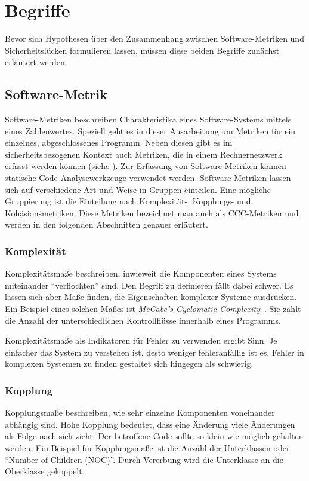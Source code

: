 \section{Begriffe}
\label{sec:begriffe}
Bevor sich Hypothesen über den Zusammenhang zwischen Software-Metriken und Sicherheitslücken formulieren lassen, müssen diese beiden Begriffe zunächst erläutert werden.

\subsection{Software-Metrik}
Software-Metriken beschreiben Charakteristika eines Software-Systems mittels eines Zahlenwertes.
Speziell geht es in dieser Ausarbeitung um Metriken für ein einzelnes, abgeschlossenes Programm.
Neben diesen gibt es im sicherheitsbezogenen Kontext auch Metriken, die in einem Rechnernetzwerk erfasst werden können (siehe \cite{cheng2014}).
Zur Erfassung von Software-Metriken können statische Code-Analysewerkzeuge verwendet werden.
Software-Metriken lassen sich auf verschiedene Art und Weise in Gruppen einteilen.
Eine mögliche Gruppierung ist die Einteilung nach Komplexität-, Kopplungs- und Kohäsionsmetriken.
Diese Metriken bezeichnet man auch als CCC-Metriken und werden in den folgenden Abschnitten genauer erläutert.

\subsubsection{Komplexität}
Komplexitätsmaße beschreiben, inwieweit die Komponenten eines Systems miteinander "`verflochten"' sind.
Den Begriff zu definieren fällt dabei schwer.
Es lassen sich aber Maße finden, die Eigenschaften komplexer Systeme ausdrücken.
Ein Beispiel eines solchen Maßes ist \textit{McCabe's Cyclomatic Complexity}~\cite{mccabe1976}.
Sie zählt die Anzahl der unterschiedlichen Kontrollflüsse innerhalb eines Programms.

Komplexitätsmaße als Indikatoren für Fehler zu verwenden ergibt Sinn.
Je einfacher das System zu verstehen ist, desto weniger fehleranfällig ist es.
Fehler in komplexen Systemen zu finden gestaltet sich hingegen als schwierig.

\subsubsection{Kopplung}
Kopplungsmaße beschreiben, wie sehr einzelne Komponenten voneinander abhängig sind.
Hohe Kopplung bedeutet, dass eine Änderung viele Änderungen als Folge nach sich zieht.
Der betroffene Code sollte so klein wie möglich gehalten werden.
Ein Beispiel für Kopplungsmaße ist die Anzahl der Unterklassen oder "`Number of Children (NOC)"'.
Durch Vererbung wird die Unterklasse an die Oberklasse gekoppelt.

